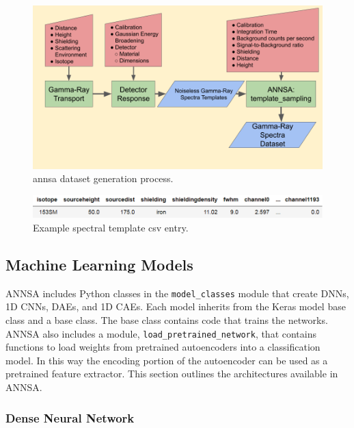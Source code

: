 \begin{figure}[H]
\centering
\includegraphics[trim=40 50 10 0,clip,width=1.0\linewidth]{images/annsa_data_generation.png}
\caption{annsa dataset generation process.}
\label{fig:annsa_data_generation}
\end{figure}

\begin{figure}[H]
\centering
\includegraphics[trim=0 0 0 0,clip,width=1.0\linewidth]{images/template_csv.png}
\caption{Example spectral template csv entry.}
\label{fig:template_csv}
\end{figure}

\subsection{Machine Learning Models}

ANNSA includes Python classes in the \verb|model_classes| module that create DNNs, 1D CNNs, DAEs, and 1D CAEs. Each model inherits from the Keras model base class and a base class. The base class contains code that trains the networks. ANNSA also includes a module, \verb|load_pretrained_network|, that contains functions to load weights from pretrained autoencoders into a classification model. In this way the encoding portion of the autoencoder can be used as a pretrained feature extractor. This section outlines the architectures available in ANNSA.

\subsubsection{Dense Neural Network}

